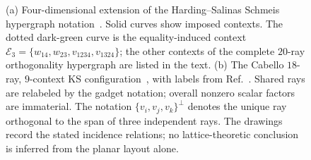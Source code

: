 \documentclass[%
  reprint,
  superscriptaddress,
  showpacs,
  showkeys,
  amsmath,amssymb,
  pra,
  longbibliography,
  floatfix,
  x11names
]{revtex4-2}
\newcommand{\rev}[1]{{#1}}
\begin{document}
\begin{figure}[ht]
\begin{tabular}{ccc}

\end{tabular}
\caption{
\rev{(a) Four-dimensional extension of the Harding--Salinas Schmeis hypergraph notation~\cite{harding2025remarksIJTP}.  Solid curves show imposed contexts.  The dotted dark-green curve is the equality-induced context $\mathcal{E}_3=\{w_{14},w_{23},v_{1234},v_{1324}\}$; the other contexts of the complete $20$-ray orthogonality hypergraph are listed in the text.  (b) The Cabello $18$-ray, $9$-context KS configuration~\cite{cabello-96}, with labels from Ref.~\cite{cabello:210401}.  Shared rays are relabeled by the gadget notation; overall nonzero scalar factors are immaterial.  The notation $\{v_i,v_j,v_k\}^{\perp}$ denotes the unique ray orthogonal to the span of three independent rays.  The drawings record the stated incidence relations; no lattice-theoretic conclusion is inferred from the planar layout alone.}
}
\label{fig:peres}
\end{figure}
\end{document}
